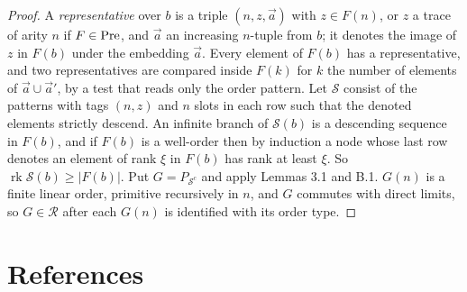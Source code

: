 \documentclass[11pt]{article}
\begin{document}
\begin{proof} A \emph{representative} over $b$ is a triple $(n, z, \vec a)$ with $z \in F(n)$, or $z$ a trace of
arity $n$ if $F \in \mathrm{Pre}$, and $\vec a$ an increasing $n$-tuple from $b$; it denotes the image of $z$ in $F(b)$
under the embedding $\vec a$. Every element of $F(b)$ has a representative, and two representatives are compared
inside $F(k)$ for $k$ the number of elements of $\vec a \cup \vec a'$, by a test that reads only the order pattern.
Let $\mathcal S$ consist of the patterns with tags $(n, z)$ and $n$ slots in each row such that the denoted
elements strictly descend. An infinite branch of $\mathcal S(b)$ is a descending sequence in $F(b)$, and if $F(b)$
is a well-order then by induction a node whose last row denotes an element of rank $\xi$ in $F(b)$ has rank at
least $\xi$. So $\operatorname{rk} \mathcal S(b) \ge |F(b)|$. Put $G = P_{\mathcal S^c}$ and apply Lemmas 3.1 and
B.1. $G(n)$ is a finite linear order, primitive recursively in $n$, and $G$ commutes with direct limits, so
$G \in \mathcal R$ after each $G(n)$ is identified with its order type.
\end{proof}

\section*{References}
\end{document}
